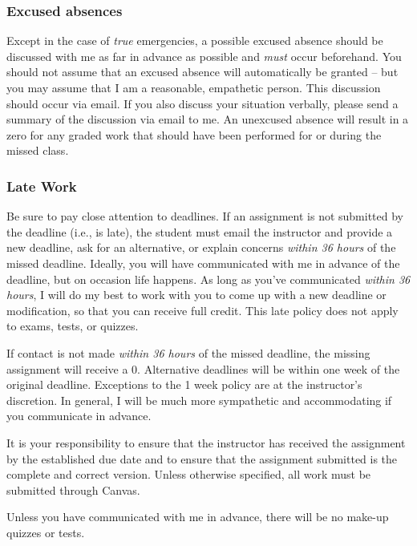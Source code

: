\documentclass[11pt,]{article}
\begin{document}
\hypertarget{excused-absences}{%
\subsubsection{Excused absences}\label{excused-absences}}

Except in the case of \emph{true} emergencies, a possible excused
absence should be discussed with me as far in advance as possible and
\emph{must} occur beforehand. You should not assume that an excused
absence will automatically be granted -- but you may assume that I am a
reasonable, empathetic person. This discussion should occur via email.
If you also discuss your situation verbally, please send a summary of
the discussion via email to me. An unexcused absence will result in a
zero for any graded work that should have been performed for or during
the missed class.

\hypertarget{late-work}{%
\subsubsection{Late Work}\label{late-work}}

Be sure to pay close attention to deadlines. If an assignment is not
submitted by the deadline (i.e., is late), the student must email the
instructor and provide a new deadline, ask for an alternative, or
explain concerns \emph{within 36 hours} of the missed deadline. Ideally,
you will have communicated with me in advance of the deadline, but on
occasion life happens. As long as you've communicated \emph{within 36
hours}, I will do my best to work with you to come up with a new
deadline or modification, so that you can receive full credit. This late
policy does not apply to exams, tests, or quizzes.

If contact is not made \emph{within 36 hours} of the missed deadline,
the missing assignment will receive a 0. Alternative deadlines will be
within one week of the original deadline. Exceptions to the 1 week
policy are at the instructor's discretion. In general, I will be much
more sympathetic and accommodating if you communicate in advance.

It is your responsibility to ensure that the instructor has received the
assignment by the established due date and to ensure that the assignment
submitted is the complete and correct version. Unless otherwise
specified, all work must be submitted through Canvas.

Unless you have communicated with me in advance, there will be no
make-up quizzes or tests.
\end{document}
